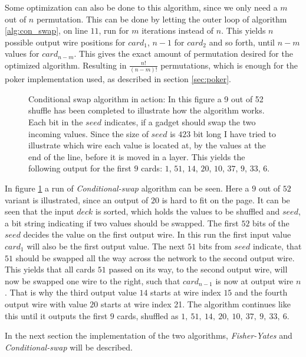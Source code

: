 \documentclass[twoside,11pt,openright]{report}
\newcommand{\FY}{\textit{Fisher-Yates} }
\newcommand{\CS}{\textit{Conditional-swap} }
\begin{document}
\bigskip

Some optimization can also be done to this algorithm, since we only need a $m$ out of $n$ permutation. This can be done by letting the outer loop of algorithm \ref{alg:con_swap}, on line $11$, run for $m$ iterations instead of $n$. This yields $n$ possible output wire positions for $card_1$, $n-1$ for $card_2$ and so forth, until $n-m$ values for $card_{n-m}$. This gives the exact amount of permutation desired for the optimized algorithm. Resulting in $\frac{n!}{(n-m)!}$ permutations, which is enough for the poker implementation used, as described in section \ref{sec:poker}.

\bigskip

\begin{figure}[t]
\centering
\scalebox{1.5}{}
\caption{Conditional swap algorithm in action: In this figure a 9 out of 52 shuffle has been completed to illustrate how the algorithm works. Each bit in the $seed$ indicates, if a gadget should swap the two incoming values. Since the size of $seed$ is $423$ bit long I have tried to illustrate which wire each value is located at, by the values at the end of the line, before it is moved in a layer. This yields the following output for the first $9$ cards: $1$, $51$, $14$, $20$, $10$, $37$, $9$, $33$, $6$.}
\label{fig:con_swap}
\end{figure}

In figure \ref{fig:con_swap} a run of \CS algorithm can be seen. Here a $9$ out of $52$ variant is illustrated, since an output of $20$ is hard to fit on the page. It can be seen that the input $deck$ is sorted, which holds the values to be shuffled and $seed$, a bit string indicating if two values should be swapped. The first $52$ bits of the $seed$ decides the value on the first output wire. In this run the first input value $card_1$ will also be the first output value. The next $51$ bits from $seed$ indicate, that $51$ should be swapped all the way across the network to the second output wire. This yields that all cards $51$ passed on its way, to the second output wire, will now be swapped one wire to the right, such that $card_{n-1}$ is now at output wire $n$. That is why the third output value $14$ starts at wire index $15$ and the fourth output wire with value $20$ starts at wire index 21. The algorithm continues like this until it outputs the first $9$ cards, shuffled as $1,~51,~14,~20,~10,~37,~9,~33,~6$.

\bigskip

In the next section the implementation of the two algorithms, \FY and \CS will be described.
\end{document}

